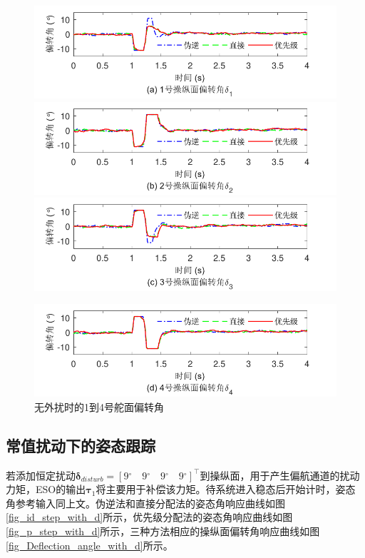 \begin{figure}[htbp]
	\centering	
	\includegraphics[scale=1]{Fig/Fig11a.pdf}
	\includegraphics[scale=1]{Fig/Fig11b.pdf}
	\includegraphics[scale=1]{Fig/Fig11c.pdf}
\end{figure}
\begin{figure}[htbp]
	\centering	
	\includegraphics[scale=1]{Fig/Fig11d.pdf}
	\caption{\label{fig_Deflection_angle_without_d}无外扰时的1到4号舵面偏转角}
\end{figure}
\subsection{常值扰动下的姿态跟踪}
若添加恒定扰动$\bm{\delta }_{disturb}= [9{}^\circ \quad 9{}^\circ \quad 9{}^\circ \quad 9{}^\circ]^\top $到操纵面，用于产生偏航通道的扰动力矩，ESO的输出$\bm{\tau}_1$将主要用于补偿该力矩。待系统进入稳态后开始计时，姿态角参考输入同上文。伪逆法和直接分配法的姿态角响应曲线如图\ref{fig_id_step_with_d}所示，优先级分配法的姿态角响应曲线如图\ref{fig_p_step_with_d}所示，三种方法相应的操纵面偏转角响应曲线如图\ref{fig_Deflection_angle_with_d}所示。


